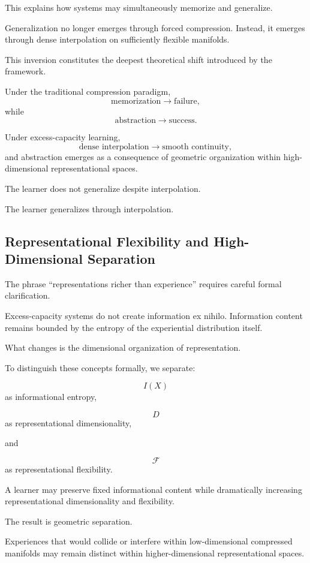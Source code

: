 \documentclass[12pt,a4paper]{article}
\begin{document}
This explains how systems may simultaneously memorize and generalize.

Generalization no longer emerges through forced compression. Instead, it emerges through dense interpolation on sufficiently flexible manifolds.

This inversion constitutes the deepest theoretical shift introduced by the framework.

Under the traditional compression paradigm,
\[
\text{memorization} \rightarrow \text{failure},
\]
while
\[
\text{abstraction} \rightarrow \text{success}.
\]

Under excess-capacity learning,
\[
\text{dense interpolation} \rightarrow \text{smooth continuity},
\]
and abstraction emerges as a consequence of geometric organization within high-dimensional representational spaces.

The learner does not generalize despite interpolation.

The learner generalizes through interpolation.

\subsection{Representational Flexibility and High-Dimensional Separation}

The phrase “representations richer than experience” requires careful formal clarification.

Excess-capacity systems do not create information ex nihilo. Information content remains bounded by the entropy of the experiential distribution itself.

What changes is the dimensional organization of representation.

To distinguish these concepts formally, we separate:

\[
I(X)
\]
as informational entropy,

\[
D
\]
as representational dimensionality,

and

\[
\mathcal{F}
\]
as representational flexibility.

A learner may preserve fixed informational content while dramatically increasing representational dimensionality and flexibility.

The result is geometric separation.

Experiences that would collide or interfere within low-dimensional compressed manifolds may remain distinct within higher-dimensional representational spaces.
\end{document}
